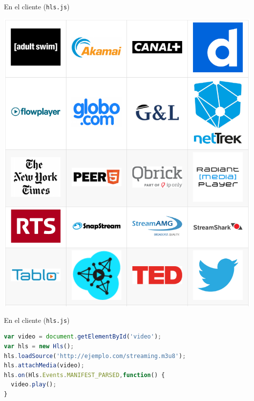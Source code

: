 \documentclass[10pt,compress,usetitleprogressbar,mathserif]{beamer}
\begin{document}
\begin{frame}{En el cliente (\texttt{hls.js})}
  \begin{center}
    \includegraphics[scale=0.2]{img/usohls.png}    
  \end{center}
\end{frame}

\begin{frame}[fragile]{En el cliente (\texttt{hls.js})}
\begin{lstlisting}[language=JavaScript]
var video = document.getElementById('video');
var hls = new Hls();
hls.loadSource('http://ejemplo.com/streaming.m3u8');
hls.attachMedia(video);
hls.on(Hls.Events.MANIFEST_PARSED,function() {
  video.play();
}
\end{lstlisting}
\end{frame}
\end{document}
